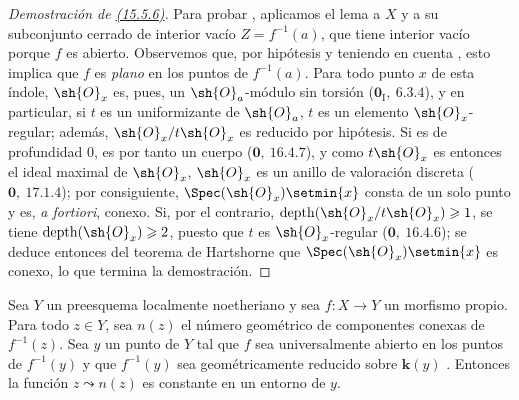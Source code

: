 \begin{proof}[Demostración de {\rm {\hyperlink{ega4.c04.lem.15-5-6}{(15.5.6)}}}]
Para probar , aplicamos el lema  a $X$ y a su subconjunto cerrado de interior vacío $Z=f^{-1}(a)$, que tiene interior vacío porque $f$ es abierto.
Observemos que, por hipótesis y teniendo en cuenta , esto implica que $f$ es \emph{plano} en los puntos de $f^{-1}(a)$.
Para todo punto $x$ de esta índole, $\sh{O}_x$ es, pues, un $\sh{O}_a$-módulo sin torsión ($\mathbf{0}_{\mathrm{I}},~6.3.4$), y en particular, si $t$ es un uniformizante de $\sh{O}_a$, $t$ es un elemento $\sh{O}_x$-regular; además, $\sh{O}_x/t\sh{O}_x$ es reducido por hipótesis. Si es de profundidad $0$, es por tanto un cuerpo ($\mathbf{0},~16.4.7$), y como $t\sh{O}_x$ es entonces el ideal maximal de $\sh{O}_x$, $\sh{O}_x$ es un anillo de valoración discreta ($\mathbf{0},~17.1.4$); por consiguiente, $\Spec(\sh{O}_x)\setmin\{x\}$ consta de un solo punto y es, \emph{a fortiori}, conexo.
Si, por el contrario, $\operatorname{depth}(\sh{O}_x/t\sh{O}_x)\geq 1$, se tiene $\operatorname{depth}(\sh{O}_x)\geq 2$, puesto que $t$ es $\sh{O}_x$-regular ($\mathbf{0},~16.4.6$); se deduce entonces del teorema de Hartshorne  que $\Spec(\sh{O}_x)\setmin\{x\}$ es conexo, lo que termina la demostración.
\end{proof}

\begin{proposition}[15.5.7]
\label{IV.15.5.7}
Sea $Y$ un preesquema localmente noetheriano y sea $f:X\to Y$ un morfismo propio.
Para todo $z\in Y$, sea $n(z)$ el número geométrico de componentes conexas de $f^{-1}(z)$.
Sea $y$ un punto de $Y$ tal que $f$ sea universalmente abierto en los puntos de $f^{-1}(y)$ y que $f^{-1}(y)$ sea geométricamente reducido sobre $\boldsymbol{k}(y)$ .
Entonces la función $z\leadsto n(z)$ es constante en un entorno de $y$.
\end{proposition}

